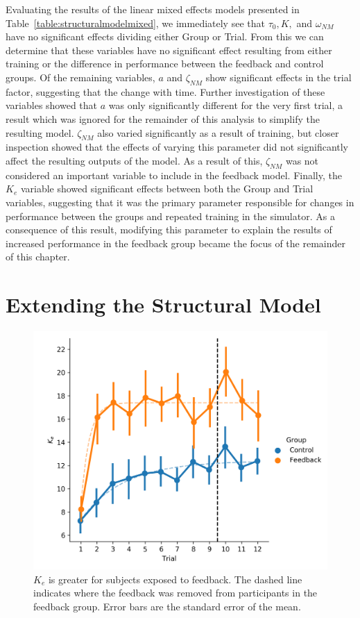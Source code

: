 Evaluating the results of the linear mixed effects models presented in Table~\ref{table:structuralmodelmixed}, we immediately see that $\tau_0, K,$ and $\omega_{NM}$ have no significant effects dividing either Group or Trial.
From this we can determine that these variables have no significant effect resulting from either training or the difference in performance between the feedback and control groups.
Of the remaining variables, $a$ and $\zeta_{NM}$ show significant effects in the trial factor, suggesting that the change with time.
Further investigation of these variables showed that $a$ was only significantly different for the very first trial, a result which was ignored for the remainder of this analysis to simplify the resulting model.
$\zeta_{NM}$ also varied significantly as a result of training, but closer inspection showed that the effects of varying this parameter did not significantly affect the resulting outputs of the model.
As a result of this, $\zeta_{NM}$ was not considered an important variable to include in the feedback model.
Finally, the $K_e$ variable showed significant effects between both the Group and Trial variables, suggesting that it was the primary parameter responsible for changes in performance between the groups and repeated training in the simulator.
As a consequence of this result, modifying this parameter to explain the results of increased performance in the feedback group became the focus of the remainder of this chapter.

\section{Extending the Structural Model}
\begin{figure}[tb]
    \centering
    \includegraphics[width=0.8\linewidth]{figures/Modeling/ke_group.png}
    \caption[$K_e$ is greater for subjects exposed to feedback]{$K_e$ is greater for subjects exposed to feedback.
    The dashed line indicates where the feedback was removed from participants in the feedback group.
    Error bars are the standard error of the mean.}
    \label{fig:ke_group}
\end{figure}

